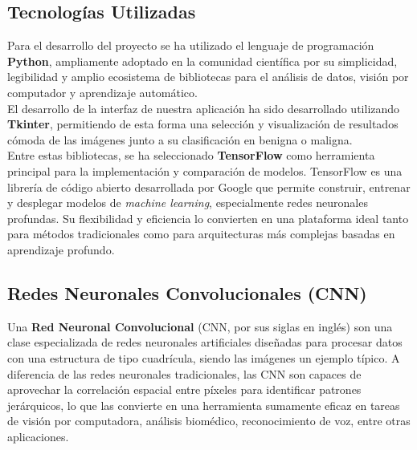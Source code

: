 \documentclass[12pt]{article} %
\begin{document}
\subsection{Tecnologías Utilizadas}
Para el desarrollo del proyecto se ha utilizado el lenguaje de programación \textbf{Python}\cite{python_org}, ampliamente adoptado en la comunidad científica por su simplicidad, legibilidad y amplio ecosistema de bibliotecas para el análisis de datos, visión por computador y aprendizaje automático.\\

El desarrollo de la interfaz de nuestra aplicación ha sido desarrollado utilizando \textbf{Tkinter}\cite{python_tkinter}, permitiendo de esta forma una selección y visualización de resultados cómoda de las imágenes junto a su clasificación en benigna o maligna.\\

Entre estas bibliotecas, se ha seleccionado \textbf{TensorFlow}\cite{tensorflow_org} como herramienta principal para la implementación y comparación de modelos. TensorFlow es una librería de código abierto desarrollada por Google que permite construir, entrenar y desplegar modelos de \textit{machine learning}, especialmente redes neuronales profundas. Su flexibilidad y eficiencia lo convierten en una plataforma ideal tanto para métodos tradicionales como para arquitecturas más complejas basadas en aprendizaje profundo.\\

\newpage
\subsection{Redes Neuronales Convolucionales (CNN)}
Una \textbf{Red Neuronal Convolucional} (CNN, por sus siglas en inglés) son una clase especializada de redes neuronales artificiales diseñadas para procesar datos con una estructura de tipo cuadrícula, siendo las imágenes un ejemplo típico. A diferencia de las redes neuronales tradicionales, las CNN son capaces de aprovechar la correlación espacial entre píxeles para identificar patrones jerárquicos, lo que las convierte en una herramienta sumamente eficaz en tareas de visión por computadora, análisis biomédico, reconocimiento de voz, entre otras aplicaciones.\\
\end{document}
